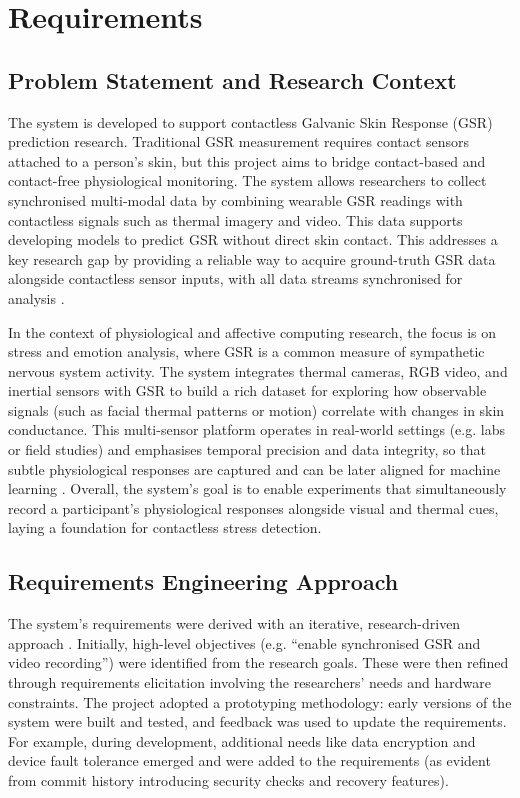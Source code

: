 \chapter{Requirements}


\section{Problem Statement and Research Context}
The system is developed to support contactless Galvanic Skin Response (GSR) prediction research. Traditional GSR measurement requires contact sensors attached to a person's skin, but this project aims to bridge contact-based and contact-free physiological monitoring. The system allows researchers to collect synchronised multi-modal data by combining wearable GSR readings with contactless signals such as thermal imagery and video. This data supports developing models to predict GSR without direct skin contact. This addresses a key research gap by providing a reliable way to acquire ground-truth GSR data alongside contactless sensor inputs, with all data streams synchronised for analysis \cite{ref1}.

In the context of physiological and affective computing research, the focus is on stress and emotion analysis, where GSR is a common measure of sympathetic nervous system activity. The system integrates thermal cameras, RGB video, and inertial sensors with GSR to build a rich dataset for exploring how observable signals (such as facial thermal patterns or motion) correlate with changes in skin conductance. This multi-sensor platform operates in real-world settings (e.g. labs or field studies) and emphasises temporal precision and data integrity, so that subtle physiological responses are captured and can be later aligned for machine learning \cite{ref1}. Overall, the system's goal is to enable experiments that simultaneously record a participant's physiological responses alongside visual and thermal cues, laying a foundation for contactless stress detection.


\section{Requirements Engineering Approach}
The system's requirements were derived with an iterative, research-driven approach \cite{ref12}. Initially, high-level objectives (e.g. ``enable synchronised GSR and video recording'') were identified from the research goals. These were then refined through requirements elicitation involving the researchers' needs and hardware constraints. The project adopted a prototyping methodology: early versions of the system were built and tested, and feedback was used to update the requirements. For example, during development, additional needs like data encryption and device fault tolerance emerged and were added to the requirements (as evident from commit history introducing security checks and recovery features).

